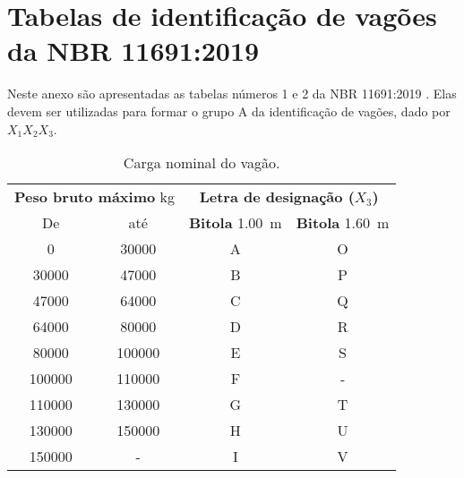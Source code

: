 \chapter{Tabelas de identificação de vagões da NBR 11691:2019}
Neste anexo são apresentadas as tabelas números 1 e 2 da NBR 11691:2019 \cite{associacao_brasileira_de_normas_tecnicas_vagao_2019}. Elas devem ser utilizadas para formar
o grupo A da identificação de vagões, dado por $X_1X_2X_3$.

\begin{table}[h]
    \centering
    \caption{Carga nominal do vagão.}
    \label{tab: carga nominal vagao ABNT}
    \begin{tabular}{cccc}
        \toprule
        \multicolumn{2}{c}{\textbf{Peso bruto máximo} \si{\kg}} & \multicolumn{2}{c}{\textbf{Letra de designação ($X_3$)}} \\
        De & até & \textbf{Bitola} \SI{1,00}{\m} & \textbf{Bitola} \SI{1,60}{\m} \\ 
         \midrule
         \num{0} &  \num{30000} & A & O\\
         \num{30000} & \num{47000} & B & P \\ 
         \num{47000} & \num{64000} & C & Q \\
         \num{64000} & \num{80000} & D & R \\
         \num{80000} & \num{100000} & E & S \\
         \num{100000} & \num{110000} & F & - \\
         \num{110000} & \num{130000} & G & T \\
         \num{130000} & \num{150000} & H & U \\
         \num{150000} & - & I & V \\
         \bottomrule
    \end{tabular}
\end{table}

